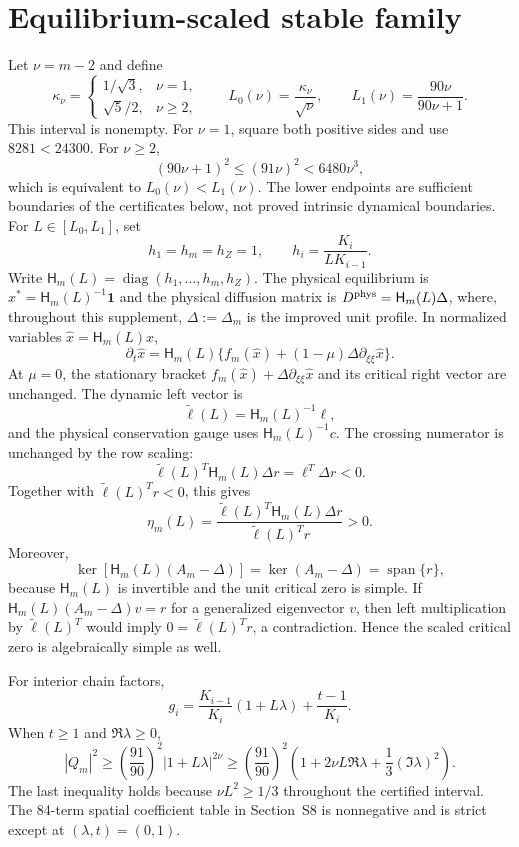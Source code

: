 \documentclass[10pt]{article}
\newcommand{\diag}{\operatorname{diag}}
\newcommand{\1}{\mathbf1}
\begin{document}
\section{Equilibrium-scaled stable family}

Let $\nu=m-2$ and define
\[
 \kappa_\nu=\begin{cases}
 1/\sqrt3,&\nu=1,\\
 \sqrt5/2,&\nu\ge2,
 \end{cases}
 \qquad
 L_0(\nu)=\frac{\kappa_\nu}{\sqrt\nu},
 \qquad
 L_1(\nu)=\frac{90\nu}{90\nu+1}.
\]
This interval is nonempty.  For $\nu=1$, square both positive sides and use
$8281<24300$.  For $\nu\ge2$,
\[
 (90\nu+1)^2\le(91\nu)^2<6480\nu^3,
\]
which is equivalent to $L_0(\nu)<L_1(\nu)$.  The lower endpoints are
sufficient boundaries of the certificates below, not proved intrinsic
dynamical boundaries.  For $L\in[L_0,L_1]$, set
\[
 h_1=h_m=h_Z=1,\qquad h_i=\frac{K_i}{LK_{i-1}}.
\]
Write $\mathsf H_m(L)=\diag(h_1,\ldots,h_m,h_Z)$.  The physical
equilibrium is $x^*=\mathsf H_m(L)^{-1}\1$ and the physical diffusion matrix
is $D^{\rm phys}=\mathsf H_m(L)\Delta$, where, throughout this supplement,
$\Delta:=\Delta_m$ is the improved unit profile.  In normalized variables
$\widehat x=\mathsf H_m(L)x$,
\[
 \partial_t\widehat x=\mathsf H_m(L)
 \{f_m(\widehat x)+(1-\mu)\Delta\partial_{\xi\xi}\widehat x\}.
\]
At $\mu=0$, the stationary bracket
$f_m(\widehat x)+\Delta\partial_{\xi\xi}\widehat x$ and its critical right
vector are unchanged.  The dynamic left vector is
\[
 \widetilde\ell(L)=\mathsf H_m(L)^{-1}\ell,
\]
and the physical conservation gauge uses $\mathsf H_m(L)^{-1}c$.
The crossing numerator is unchanged by the row scaling:
\[
 \widetilde\ell(L)^T\mathsf H_m(L)\Delta r
 =\ell^T\Delta r<0.
\]
Together with $\widetilde\ell(L)^Tr<0$, this gives
\[
 \eta_m(L)=
 \frac{\widetilde\ell(L)^T\mathsf H_m(L)\Delta r}
 {\widetilde\ell(L)^Tr}>0.
\]
Moreover,
\[
 \ker\!\left[\mathsf H_m(L)(A_m-\Delta)\right]
 =\ker(A_m-\Delta)=\operatorname{span}\{r\},
\]
because $\mathsf H_m(L)$ is invertible and the unit critical zero is simple.
If $\mathsf H_m(L)(A_m-\Delta)v=r$ for a generalized eigenvector $v$, then
left multiplication by $\widetilde\ell(L)^T$ would imply
$0=\widetilde\ell(L)^Tr$, a contradiction.  Hence the scaled critical
zero is algebraically simple as well.

For interior chain factors,
\[
 g_i=\frac{K_{i-1}}{K_i}(1+L\lambda)+\frac{t-1}{K_i}.
\]
When $t\ge1$ and $\Re\lambda\ge0$,
\[
 |Q_m|^2\ge\left(\frac{91}{90}\right)^2|1+L\lambda|^{2\nu}
 \ge\left(\frac{91}{90}\right)^2
 \left(1+2\nu L\Re\lambda+\frac13(\Im\lambda)^2\right).
\]
The last inequality holds because $\nu L^2\ge1/3$ throughout the certified
interval.  The 84-term spatial coefficient table in Section~S8 is
nonnegative and is strict except at $(\lambda,t)=(0,1)$.
\end{document}
